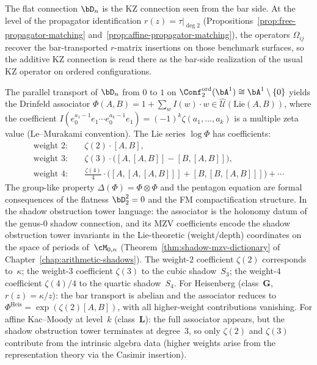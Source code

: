 The flat connection $\bD_n$ is the KZ connection seen from
the bar side. At the level of the propagator identification
$r(z) = \tau|_{\deg 2}$
(Propositions~\ref{prop:free-propagator-matching}
and~\ref{prop:affine-propagator-matching}), the operators
$\Omega_{ij}$ recover the bar-transported $r$-matrix
insertions on those benchmark surfaces, so the additive KZ
connection is read there as the bar-side realization of the
usual KZ operator on ordered configurations.

\begin{remark}%
\label{rem:drinfeld-associator-mzv-content}%
%
%
The parallel transport of $\bD_n$ from $0$ to $1$ on
$\Conf_2^{\mathrm{ord}}(\bA^1) \cong \bA^1 \setminus \{0\}$
yields the Drinfeld associator
$\Phi(A, B) = 1 + \sum_w I(w) \cdot w \in
\hat{\mathcal{U}}(\mathrm{Lie}(A, B))$,
where the coefficient $I(e_0^{a_1-1} e_1 \cdots
e_0^{a_k-1} e_1) = (-1)^k \zeta(a_1, \ldots, a_k)$
is a multiple zeta value (Le--Murakami convention).
The Lie series $\log \Phi$ has coefficients:
\begin{align*}
\text{weight } 2{:}\quad &
\zeta(2) \cdot [A, B], \\
\text{weight } 3{:}\quad &
\zeta(3) \cdot \bigl([A, [A, B]] - [B, [A, B]]\bigr), \\
\text{weight } 4{:}\quad &
\tfrac{\zeta(4)}{4} \cdot
\bigl([A, [A, [A, B]]] + [B, [B, [A, B]]]\bigr) + \cdots
\end{align*}
The group-like property $\Delta(\Phi) = \Phi \otimes \Phi$ and
the pentagon equation are formal consequences of the flatness
$\bD_2^2 = 0$ and the FM compactification structure.
In the shadow obstruction tower language: the associator is the holonomy
datum of the genus-$0$ shadow connection, and its MZV
coefficients encode the shadow obstruction tower invariants in the
Lie-theoretic (weight/depth) coordinates on the space of
periods of~$\cM_{0,n}$
(Theorem~\ref{thm:shadow-mzv-dictionary} of
Chapter~\ref{chap:arithmetic-shadows}).
The weight-$2$ coefficient $\zeta(2)$ corresponds to~$\kappa$;
the weight-$3$ coefficient $\zeta(3)$ to the cubic shadow~$S_3$;
the weight-$4$ coefficient $\zeta(4)/4$ to the quartic
shadow~$S_4$. For Heisenberg
(class~$\mathbf{G}$, $r(z) = \kappa/z$):
the bar transport is abelian and the associator reduces to
$\Phi^{\mathrm{Heis}} = \exp(\zeta(2) [A, B])$, with all
higher-weight contributions vanishing.
For affine Kac--Moody at level~$k$ (class~$\mathbf{L}$):
the full associator appears, but the shadow obstruction tower terminates
at degree~$3$, so only $\zeta(2)$ and $\zeta(3)$ contribute
from the intrinsic algebra data (higher weights arise from
the representation theory via the Casimir insertion).
\end{remark}

